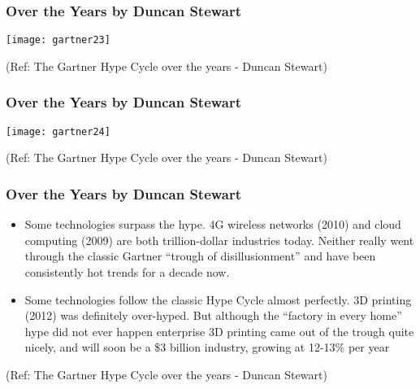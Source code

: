 \begin{frame}[fragile]\frametitle{Over the Years by Duncan Stewart}


\begin{center}
\texttt{[image: gartner23]}
\end{center}


{\tiny (Ref: The Gartner Hype Cycle over the years - Duncan Stewart)}

\end{frame}

\begin{frame}[fragile]\frametitle{Over the Years by Duncan Stewart}

\begin{center}
\texttt{[image: gartner24]}
\end{center}


{\tiny (Ref: The Gartner Hype Cycle over the years - Duncan Stewart)}

\end{frame}

\begin{frame}[fragile]\frametitle{Over the Years by Duncan Stewart}


\begin{itemize}
\item Some technologies surpass the hype. 4G wireless networks (2010) and cloud computing (2009) are both trillion-dollar industries today. Neither really went through the classic Gartner “trough of disillusionment” and have been consistently hot trends for a decade now.

\item Some technologies follow the classic Hype Cycle almost perfectly. 3D printing (2012) was definitely over-hyped. But although the “factory in every home” hype did not ever happen enterprise 3D printing came out of the trough quite nicely, and will soon be a \$3 billion industry, growing at 12-13\% per year

\end{itemize}

{\tiny (Ref: The Gartner Hype Cycle over the years - Duncan Stewart)}


\end{frame}

